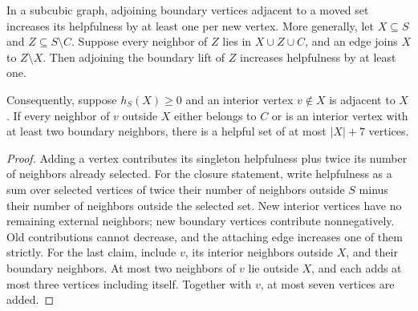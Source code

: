 \begin{theorem}
  \label{thm:lowerbounds-algebraic-helpful-growth}
  \leanok
  In a subcubic graph, adjoining boundary vertices adjacent to a moved
  set increases its helpfulness by at least one per new vertex.
  More generally, let $X\subseteq S$ and $Z\subseteq S\setminus C$.
  Suppose every neighbor of $Z$ lies in $X\cup Z\cup C$, and an edge
  joins $X$ to $Z\setminus X$. Then adjoining the boundary lift of $Z$
  increases helpfulness by at least one.

  Consequently, suppose $h_S(X)\ge0$ and an interior vertex $v\notin X$
  is adjacent to $X$. If every neighbor of $v$ outside $X$ either belongs
  to $C$ or is an interior vertex with at least two boundary neighbors,
  there is a helpful set of at most $|X|+7$ vertices.
\end{theorem}
\begin{proof}
  \leanok
  Adding a vertex contributes its singleton helpfulness plus twice its
  number of neighbors already selected. For the closure statement, write
  helpfulness as a sum over selected vertices of twice their number of
  neighbors outside $S$ minus their number of neighbors outside the
  selected set. New interior vertices have no remaining external neighbors;
  new boundary vertices contribute nonnegatively. Old contributions cannot
  decrease, and the attaching edge increases one of them strictly.
  For the last claim, include $v$, its interior neighbors outside $X$,
  and their boundary neighbors. At most two neighbors of $v$ lie outside
  $X$, and each adds at most three vertices including itself. Together
  with $v$, at most seven vertices are added.
\end{proof}

